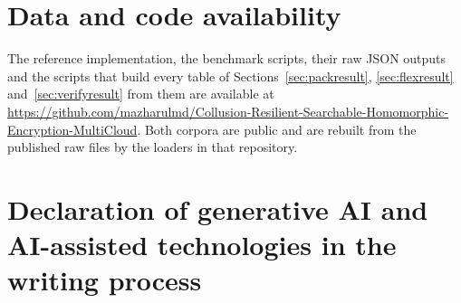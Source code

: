 \documentclass[a4paper,fleqn]{cas-dc}
\newif\ifauthorchecks
\newcommand{\authorcheck}[1]{\ifauthorchecks{\color{red}\textsf{[Authors: #1]}}\fi}
\begin{document}
\section*{Data and code availability}
\label{sec:dataavail}
The reference implementation, the benchmark scripts, their raw JSON outputs
and the scripts that build every table of Sections~\ref{sec:packresult},
\ref{sec:flexresult} and~\ref{sec:verifyresult} from them are available at
\url{https://github.com/mazharulmd/Collusion-Resilient-Searchable-Homomorphic-Encryption-MultiCloud}.
Both corpora are public \citep{stafford_2020_environmental,zhang2017cautionary}
and are rebuilt from the published raw files by the loaders in that repository.
\authorcheck{Add the C++ prototype to the repository, or state where it is
available, and archive a tagged release (e.g.\ on Zenodo) for the DOI.}

\section*{Declaration of generative AI and AI-assisted technologies in the
writing process}
\authorcheck{Rewrite this declaration so that it accurately describes how
generative AI tools were used in the manuscript, the figures, the reference
implementation and this revision. Publishers require it to be accurate.}



\end{document}
